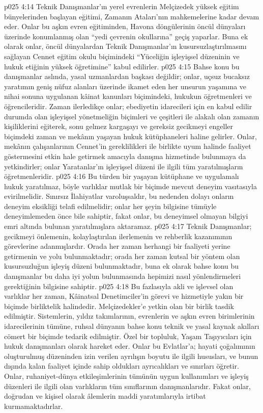 \vs p025 4:14 Teknik Danışmanlar’ın yerel evrenlerin Melçizedek yüksek eğitim bünyelerinden başlayan eğitimi, Zamanın Ataları’nın mahkemelerine kadar devam eder. Onlar bu aşkın evren eğitiminden, Havona döngülerinin öncül dünyaları üzerinde konumlanmış olan “yedi çevrenin okullarına” geçiş yaparlar. Buna ek olarak onlar, öncül dünyalardan Teknik Danışmanlar’ın kusursuzlaştırılmasını sağlayan Cennet eğitim okulu biçimindeki “Yüceliğin işleyişsel düzeninin ve hukuk etiğinin yüksek öğretimine” kabul edilirler.
\vs p025 4:15 Bahse konu bu danışmanlar aslında, yasal uzmanlardan başkası değildir; onlar, uçsuz bucaksız yaratımın geniş nüfuz alanları üzerinde ikamet eden her unsurun yaşamına ve nihai sonuna uygulanan kâinat kanunları biçimindeki,  hukukun öğretmenleri ve öğrencileridir. Zaman ilerledikçe onlar; ebediyetin idarecileri için en kabul edilir durumda olan işleyişsel yönetmeliğin biçimleri ve çeşitleri ile alakalı olan zamanın kişiliklerini eğiterek, sonu gelmez kargaşayı ve gereksiz gecikmeyi engeller biçimdeki zaman ve mekânın yaşayan hukuk kütüphaneleri haline gelirler. Onlar, mekânın çalışanlarının Cennet’in gereklilikleri ile birlikte uyum halinde faaliyet göstermesini etkin hale getirmek amacıyla danışma hizmetinde bulunmaya da yetkindirler; onlar Yaratanlar’ın işleyişsel düzeni ile ilgili tüm yaratılmışların öğretmenleridir.
\vs p025 4:16 Bu türden bir yaşayan kütüphane ve uygulamalı hukuk yaratılmaz, böyle varlıklar mutlak bir biçimde mevcut deneyim vasıtasıyla evirilmelidir. Sınırsız İlahiyatlar varoluşsaldır, bu nedenden dolayı onların deneyim eksikliği telafi edilmelidir; onlar her şeyin bilgisine tümüyle deneyimlemeden önce bile sahiptir, fakat onlar, bu deneyimsel olmayan bilgiyi emri altında bulunan yaratılmışlara aktaramaz.
\vs p025 4:17 Teknik Danışmanlar; gecikmeyi önlemenin, kolaylaştırılan ilerlemenin ve rehberlik kazanımının görevlerine adanmışlardır. Orada her zaman herhangi bir faaliyeti yerine getirmenin  ve  yolu bulunmaktadır; orada her zaman kutsal bir yöntem olan kusursuzluğun işleyiş düzeni bulunmaktadır, buna ek olarak bahse konu bu danışmanlar bu daha iyi yolun bulunmasında hepimizi nasıl yönlendirmeleri gerektiğinin bilgisine sahiptir.
\vs p025 4:18 Bu fazlasıyla akli ve işlevsel olan varlıklar her zaman, Kâinatsal Denetimciler’in görevi ve hizmetiyle yakın bir biçimde birliktelik halindedir. Melçizedekler’e yetkin olan bir birlik tasdik edilmiştir. Sistemlerin, yıldız takımlarının, evrenlerin ve aşkın evren birimlerinin idarecilerinin tümüne, ruhsal dünyanın bahse konu teknik ve yasal kaynak akılları cömert bir biçimde tedarik edilmiştir. Özel bir topluluk, Yaşam Taşıyıcıları için hukuk danışmanları olarak hareket eder. Onlar bu Evlatlar’a; hayati çoğalımının oluşturulmuş düzeninden izin verilen ayrılışın boyutu ile ilgili hususları, ve bunun dışında kalan faaliyet içinde sahip oldukları ayrıcalıkları ve sınırları öğretir. Onlar, ruhaniyet\hyp{}dünya etkileşimlerinin tümünün uygun kullanımları ve işleyiş düzenleri ile ilgili olan varlıkların tüm sınıflarının danışmanlarıdır. Fakat onlar, doğrudan ve kişisel olarak âlemlerin maddi yaratımlarıyla irtibat kurmamaktadırlar.
